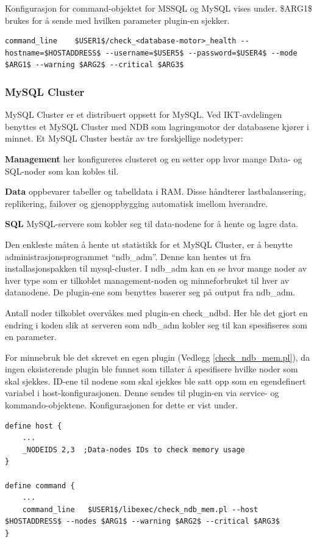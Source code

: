 Konfigurasjon for command-objektet for MSSQL og MySQL vises under. \$ARG1\$ brukes for å sende med hvilken parameter plugin-en sjekker.
\begin{lstlisting}[style=example]
    command_line	$USER1$/check_<database-motor>_health --hostname=$HOSTADDRESS$ --username=$USER5$ --password=$USER4$ --mode $ARG1$ --warning $ARG2$ --critical $ARG3$
\end{lstlisting}

\subsubsection{MySQL Cluster}
MySQL Cluster er et distribuert oppsett for MySQL. Ved IKT-avdelingen benyttes et MySQL Cluster med NDB som lagringsmotor der databasene kjører i minnet. Et MySQL Cluster består av tre forskjellige nodetyper\cite{ndbinformation}:
\begin{itemize*}
	\item \textbf{Management} her konfigureres clusteret og en setter opp hvor mange Data- og SQL-noder som kan kobles til.
	\item \textbf{Data} oppbevarer tabeller og tabelldata i RAM. Disse håndterer lastbalansering, replikering, failover og gjenoppbygging automatisk imellom hverandre.
	\item \textbf{SQL} MySQL-servere som kobler seg til data-nodene for å hente og lagre data.
\end{itemize*}

Den enkleste måten å hente ut statistikk for et MySQL Cluster, er å benytte administrasjonsprogrammet ``ndb\_adm''. Denne kan hentes ut fra installasjonspakken til mysql-cluster\cite{ndbdownload}. I ndb\_adm kan en se hvor mange noder av hver type som er tilkoblet management-noden og minneforbruket til hver av datanodene. De plugin-ene som benyttes baserer seg på output fra ndb\_adm.

Antall noder tilkoblet overvåkes med plugin-en check\_ndbd\cite{ndbnode}. Her ble det gjort en endring i koden slik at serveren som ndb\_adm kobler seg til kan spesifiseres som en parameter.

For minnebruk ble det skrevet en egen plugin (Vedlegg \ref{check_ndb_mem.pl}), da ingen eksisterende plugin ble funnet som tillater å spesifisere hvilke noder som skal sjekkes. ID-ene til nodene som skal sjekkes ble satt opp som en egendefinert variabel i host-konfigurasjonen. Denne sendes til plugin-en via service- og kommando-objektene. Konfigurasjonen for dette er vist under.
\begin{lstlisting}[style=example]
define host {
	...
	_NODEIDS 2,3  ;Data-nodes IDs to check memory usage
}

define command {
	...
	command_line   $USER1$/libexec/check_ndb_mem.pl --host $HOSTADDRESS$ --nodes $ARG1$ --warning $ARG2$ --critical $ARG3$
}
\end{lstlisting}

